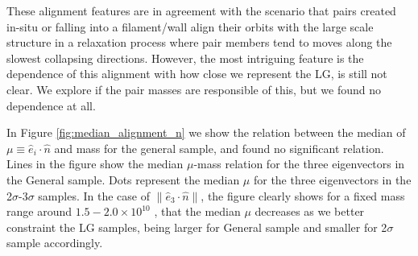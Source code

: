 \documentclass{emulateapj}
\newcommand{\msun}{{\ifmmode{{\rm {M_{\odot}}}}\else{${\rm{M_{\odot}}}$}\fi}}
\begin{document}
These alignment features are in agreement with the scenario that pairs 
created in-situ or falling into a filament/wall align their orbits with 
the large scale structure in a relaxation process where pair members
tend to moves along the slowest collapsing directions.
However, the most intriguing feature is the dependence of this alignment
with how close we represent the LG, is still not clear.
We explore if the pair masses are responsible of this, but we found 
no dependence at all.

In Figure \ref{fig:median_alignment_n} we show the relation between the median 
of $\mu\equiv\hat{e}_i\cdot\hat{n}$ and mass for the general sample, and found 
no significant relation.
Lines in the figure show the median $\mu$-mass relation for the three 
eigenvectors in the General sample.
Dots represent the median $\mu$ for the three eigenvectors in the 
2$\sigma$-3$\sigma$ samples.
In the case of $\|\hat{e}_3\cdot\hat{n}\|$, the figure clearly shows for a fixed mass
range around $1.5-2.0 \times 10^{10}$ \msun, that the median $\mu$ decreases as we
better constraint the LG samples, being larger for General sample and smaller for 
2$\sigma$ sample accordingly.




\end{document}
